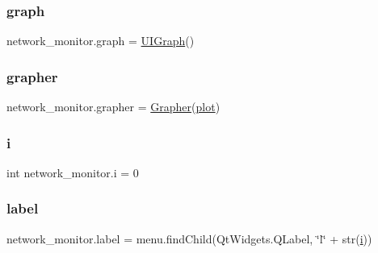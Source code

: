\subsubsection{\texorpdfstring{graph}{graph}}
{\footnotesize\ttfamily network\+\_\+monitor.\+graph = \hyperlink{classnetwork__monitor_1_1_u_i_graph}{U\+I\+Graph}()}

\mbox{\label{namespacenetwork__monitor_a6caf9d5fe8492a62de30cc09eb3d6ee0}} 
\subsubsection{\texorpdfstring{grapher}{grapher}}
{\footnotesize\ttfamily network\+\_\+monitor.\+grapher = \hyperlink{classnetwork__monitor_1_1_grapher}{Grapher}(\hyperlink{namespacenetwork__monitor_a26e25ec561afa4ed83eebb64d67c1b14}{plot})}

\mbox{\label{namespacenetwork__monitor_acbaeef9dd38caeac7bfb4ce5cc555a68}} 
\subsubsection{\texorpdfstring{i}{i}}
{\footnotesize\ttfamily int network\+\_\+monitor.\+i = 0}

\mbox{\label{namespacenetwork__monitor_a581e75b195d137edaf37a10c8f54f10b}} 
\subsubsection{\texorpdfstring{label}{label}}
{\footnotesize\ttfamily network\+\_\+monitor.\+label = menu.\+find\+Child(Qt\+Widgets.\+Q\+Label, \char`\"{}l\char`\"{} + str(\hyperlink{namespacenetwork__monitor_acbaeef9dd38caeac7bfb4ce5cc555a68}{i}))}

\mbox{\label{namespacenetwork__monitor_a7a1dfe61bcb6dea8bb5e51d87cfa6674}} 
